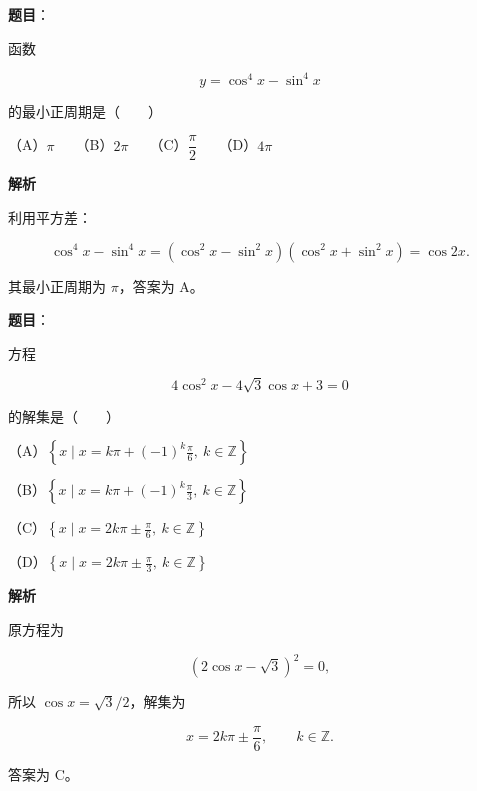 \begin{answer}

\textbf{题目}：

函数

\nopagebreak[4]
\[
y=\cos^4x-\sin^4x
\]

的最小正周期是\mbox{（　　）}

（A）$\pi$　　（B）$2\pi$　　（C）$\dfrac\pi2$　　（D）$4\pi$

\textbf{解析}

利用平方差：

\nopagebreak[4]
\[
\cos^4x-\sin^4x
=(\cos^2x-\sin^2x)(\cos^2x+\sin^2x)
=\cos2x.
\]

其最小正周期为 $\pi$，答案为 A。


\end{answer}
\begin{answer}

\textbf{题目}：

方程

\nopagebreak[4]
\[
4\cos^2x-4\sqrt3\cos x+3=0
\]

的解集是\mbox{（　　）}

（A）$\left\{x\mid x=k\pi+(-1)^k\frac\pi6,\ k\in\mathbb Z\right\}$

（B）$\left\{x\mid x=k\pi+(-1)^k\frac\pi3,\ k\in\mathbb Z\right\}$

（C）$\left\{x\mid x=2k\pi\pm\frac\pi6,\ k\in\mathbb Z\right\}$

（D）$\left\{x\mid x=2k\pi\pm\frac\pi3,\ k\in\mathbb Z\right\}$

\textbf{解析}

原方程为

\nopagebreak[4]
\[
(2\cos x-\sqrt3)^2=0,
\]

所以 $\cos x=\sqrt3/2$，解集为

\nopagebreak[4]
\[
x=2k\pi\pm\frac\pi6,\qquad k\in\mathbb Z.
\]

答案为 C。


\end{answer}

